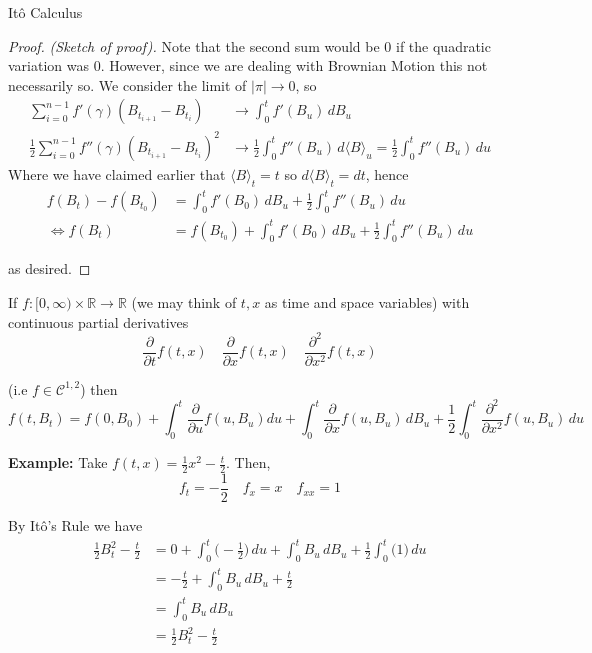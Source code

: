 \documentclass[12pt]{article}
\newenvironment{theorem}[2][Theorem:]{\begin{trivlist} %
\item[\hskip \labelsep {\bfseries #1}\hskip \labelsep {\bfseries #2.}]}{\end{trivlist}}
\newlength\tindent
\renewcommand{\indent}{\hspace*{\tindent}}
\begin{document}
\begin{section}{It\^{o} Calculus}
\begin{theorem}{It\^{o}'s Rule}
\begin{proof} {\em (Sketch of proof).}
\indent Note that the second sum would be 0 if the quadratic variation was 0. However, since we are dealing with Brownian Motion this not necessarily so. We consider the limit of $|\pi|\longrightarrow 0$, so
\begin{align*}
	\sum^{n-1}_{i=0}f'(\gamma)(B_{t_{i+1}} - B_{t_i}) &\longrightarrow \int^t_0f'(B_u)\,dB_u \\
	\frac{1}{2}\sum^{n-1}_{i=0}f''(\gamma)(B_{t_{i+1}} - B_{t_i})^2 &\longrightarrow  \frac{1}{2}\int^t_0 f''(B_u)\,d\langle B\rangle_u = \frac{1}{2}\int^t_0 f''(B_u)\,du
\end{align*}
Where we have claimed earlier that $\langle B\rangle_t = t$ so $d\langle B\rangle_t = dt$, hence
\begin{align*}
	f(B_t) - f(B_{t_0}) &= \int^t_0 f'(B_0)\,dB_u + \frac{1}{2}\int^t_0 f''(B_u)\,du \\
	\iff f(B_t) &= f(B_{t_0}) + \int^t_0 f'(B_0)\,dB_u + \frac{1}{2}\int^t_0 f''(B_u)\,du
\end{align*}

as desired.
\end{proof}
\end{theorem}

\begin{theorem}{It\^{o}'s Rule in Two Variables} If $f:[0,\infty)\times\mathbb R \rightarrow \mathbb R$ (we may think of $t,x$ as time and space variables) with continuous partial derivatives
\begin{equation*}
	\frac{\partial}{\partial t}f(t,x) \quad \frac{\partial}{\partial x}f(t,x) \quad \frac{\partial^2}{\partial x^2} f(t,x)
\end{equation*}

(i.e $f \in \mathcal C^{1,2}$) then
\begin{equation*}
	f(t,B_t) = f(0,B_0) + \int^t_0 \frac{\partial}{\partial u} f(u, B_u) du + \int^t_0\frac{\partial}{\partial x} f(u, B_u)\,dB_u + \frac{1}{2} \int^t_0\frac{\partial^2}{\partial x^2} f(u, B_u)\,du
\end{equation*}
\end{theorem}

{\bf Example:} Take $f(t,x) = \frac{1}{2}x^2 - \frac{t}{2}$. Then,
\begin{equation*}
	f_t = -\frac{1}{2} \quad f_x = x \quad f_{xx} = 1
\end{equation*}

By It\^{o}'s Rule we have
\begin{align*}
	\frac{1}{2}B^2_t - \frac{t}{2} &= 0 + \int^t_0\Big(-\frac{1}{2}\Big)\,du + \int^t_0 B_u\,dB_u + \frac{1}{2}\int^t_0\Big(1\Big)\,du \\
	&= -\frac{t}{2} + \int^t_0 B_u\,dB_u + \frac{t}{2} \\
	&=  \int^t_0 B_u\,dB_u \\
	&= \frac{1}{2}B^2_t - \frac{t}{2}
\end{align*}


\end{section}
\end{document}
